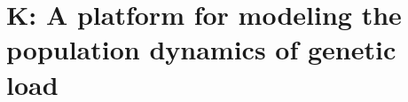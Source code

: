 % 

\newcommand{\K}{{\bf K}}      %

\chapter[\K: Modeling genetic load]{\K: A platform for modeling the population dynamics of genetic load}

%
%
\newcommand{\REDO}{{\bf {\em REDO!}}}
%
\newcommand{\ProbDist}[2]{\mbox{{\bf #1}$(#2)$}}
\newcommand{\Order}[1]{\mbox{$\text{{\bf O}}(#1)$}}  %
\newcommand{\genotype}[2]{\mbox{$({#1}{#2})$}}
\newcommand{\Kcode}[1]{{\tt #1}}
\newcommand{\Cmdline}[1]{{\tt #1}}
\newcommand{\KK}{\mbox{{\tt K}}}  %
\newcommand{\Kmember}[1]{\mbox{{\tt K->#1}}}
\newcommand{\Kmemberi}[2]{\mbox{{\tt K->#1[{\it #2}\/]}}}
\newcommand{\Kmemberij}[3]{\mbox{{\tt K->#1[{\it #2}\/][{\it #3}\/]}}}
\newcommand{\Kmemberijk}[4]{\mbox{{\tt K->#1[{\it #2}\/][{\it #3}\/][{\it #4}\/]}}}
\newcommand{\KScalar}{\mbox{\tt KScalar}}
\newcommand{\KInt}{\mbox{\tt KInt}}
\newcommand{\KArray}{\mbox{\tt KArray}}
\newcommand{\KConfig}{\mbox{\tt KConfig}}

\newcommand{\izero}{\mbox{$i_0$\/}}
\newcommand{\jzero}{\mbox{$j_0$\/}}
\newcommand{\ione}{\mbox{$i_1$\/}}
\newcommand{\jone}{\mbox{$j_1$\/}}
\newcommand{\nzero}{\mbox{$n_0$\/}}
\newcommand{\none}{\mbox{$n_1$\/}}
\newcommand{\Lijij}{\mbox{$L($\izero,\jzero,\ione,\jone$)$}}
\newcommand{\Mizero}{\mbox{$M_{i_0}$\/}}
\newcommand{\Mjzero}{\mbox{$M_{j_0}$\/}}
\newcommand{\Mione}{\mbox{$M_{i_1}$\/}}
\newcommand{\Mjone}{\mbox{$M_{j_1}$\/}}
\newcommand{\wnested}{\mbox{$w_{i_0\/,j_0\/,i_1\/,j_1\/}$}}
\newcommand{\meanwnested}{\mbox{$\bar{w}_{01}$}}

\newcommand{\gami}{\mbox{$f_{i}$}}
\newcommand{\gammalei}{\mbox{$f_{i}^{\text{\Male}}$}}
\newcommand{\gamfemalei}{\mbox{$f_{i}^{\text{\Female}}$}}
\newcommand{\gammalek}{\mbox{$f_{k}^{\text{\Male}}$}}
\newcommand{\gamfemalek}{\mbox{$f_{k}^{\text{\Female}}$}}
\newcommand{\gammaleik}{\mbox{$f_{i-k}^{\text{\Male}}$}}
\newcommand{\gamfemaleik}{\mbox{$f_{i-k}^{\text{\Female}}$}}

